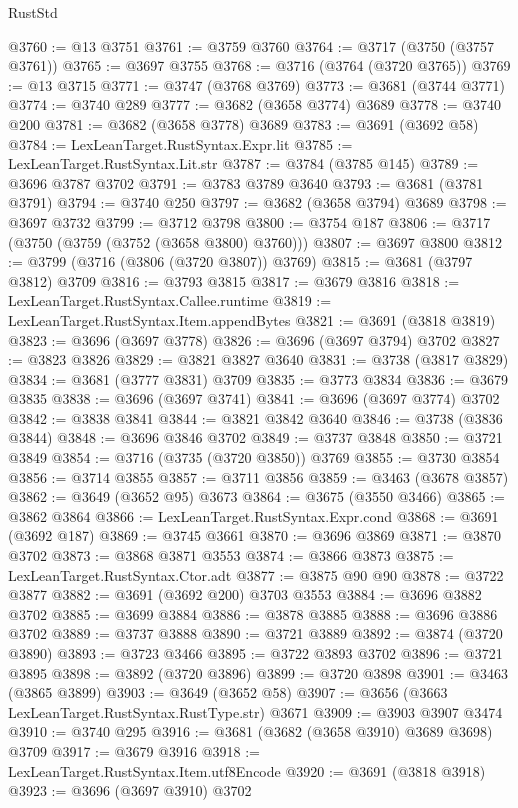 \begin{lexlean}{RustStd}
\begin{coremodule}
@3760 := @13 @3751
@3761 := @3759 @3760
@3764 := @3717 (@3750 (@3757 @3761))
@3765 := @3697 @3755
@3768 := @3716 (@3764 (@3720 @3765))
@3769 := @13 @3715
@3771 := @3747 (@3768 @3769)
@3773 := @3681 (@3744 @3771)
@3774 := @3740 @289
@3777 := @3682 (@3658 @3774) @3689
@3778 := @3740 @200
@3781 := @3682 (@3658 @3778) @3689
@3783 := @3691 (@3692 @58)
@3784 := LexLeanTarget.RustSyntax.Expr.lit
@3785 := LexLeanTarget.RustSyntax.Lit.str
@3787 := @3784 (@3785 @145)
@3789 := @3696 @3787 @3702
@3791 := @3783 @3789 @3640
@3793 := @3681 (@3781 @3791)
@3794 := @3740 @250
@3797 := @3682 (@3658 @3794) @3689
@3798 := @3697 @3732
@3799 := @3712 @3798
@3800 := @3754 @187
@3806 := @3717 (@3750 (@3759 (@3752 (@3658 @3800) @3760)))
@3807 := @3697 @3800
@3812 := @3799 (@3716 (@3806 (@3720 @3807)) @3769)
@3815 := @3681 (@3797 @3812) @3709
@3816 := @3793 @3815
@3817 := @3679 @3816
@3818 := LexLeanTarget.RustSyntax.Callee.runtime
@3819 := LexLeanTarget.RustSyntax.Item.appendBytes
@3821 := @3691 (@3818 @3819)
@3823 := @3696 (@3697 @3778)
@3826 := @3696 (@3697 @3794) @3702
@3827 := @3823 @3826
@3829 := @3821 @3827 @3640
@3831 := @3738 (@3817 @3829)
@3834 := @3681 (@3777 @3831) @3709
@3835 := @3773 @3834
@3836 := @3679 @3835
@3838 := @3696 (@3697 @3741)
@3841 := @3696 (@3697 @3774) @3702
@3842 := @3838 @3841
@3844 := @3821 @3842 @3640
@3846 := @3738 (@3836 @3844)
@3848 := @3696 @3846 @3702
@3849 := @3737 @3848
@3850 := @3721 @3849
@3854 := @3716 (@3735 (@3720 @3850)) @3769
@3855 := @3730 @3854
@3856 := @3714 @3855
@3857 := @3711 @3856
@3859 := @3463 (@3678 @3857)
@3862 := @3649 (@3652 @95) @3673
@3864 := @3675 (@3550 @3466)
@3865 := @3862 @3864
@3866 := LexLeanTarget.RustSyntax.Expr.cond
@3868 := @3691 (@3692 @187)
@3869 := @3745 @3661
@3870 := @3696 @3869
@3871 := @3870 @3702
@3873 := @3868 @3871 @3553
@3874 := @3866 @3873
@3875 := LexLeanTarget.RustSyntax.Ctor.adt
@3877 := @3875 @90 @90
@3878 := @3722 @3877
@3882 := @3691 (@3692 @200) @3703 @3553
@3884 := @3696 @3882 @3702
@3885 := @3699 @3884
@3886 := @3878 @3885
@3888 := @3696 @3886 @3702
@3889 := @3737 @3888
@3890 := @3721 @3889
@3892 := @3874 (@3720 @3890)
@3893 := @3723 @3466
@3895 := @3722 @3893 @3702
@3896 := @3721 @3895
@3898 := @3892 (@3720 @3896)
@3899 := @3720 @3898
@3901 := @3463 (@3865 @3899)
@3903 := @3649 (@3652 @58)
@3907 := @3656 (@3663 LexLeanTarget.RustSyntax.RustType.str) @3671
@3909 := @3903 @3907 @3474
@3910 := @3740 @295
@3916 := @3681 (@3682 (@3658 @3910) @3689 @3698) @3709
@3917 := @3679 @3916
@3918 := LexLeanTarget.RustSyntax.Item.utf8Encode
@3920 := @3691 (@3818 @3918)
@3923 := @3696 (@3697 @3910) @3702

\end{coremodule}
\end{lexlean}
